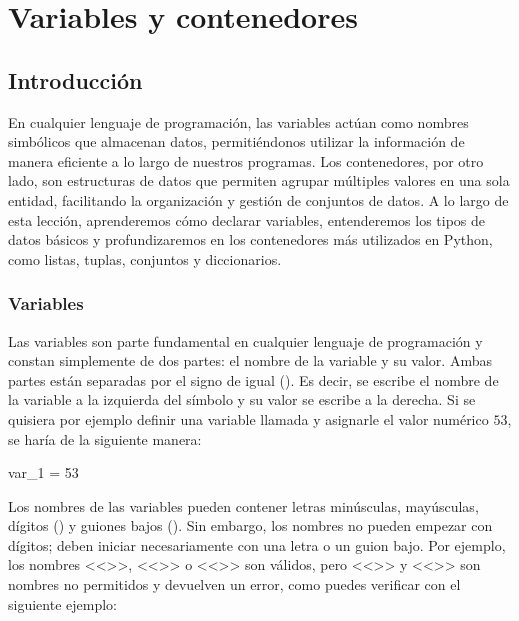 \chapter{Variables y contenedores}

\setcounter{ipythcntr}{0}

\section{Introducción}
En cualquier lenguaje de programación, las variables actúan como nombres simbólicos que almacenan datos, permitiéndonos utilizar la información de manera eficiente a lo largo de nuestros programas. Los contenedores, por otro lado, son estructuras de datos que permiten agrupar múltiples valores en una sola entidad, facilitando la organización y gestión de conjuntos de datos. A lo largo de esta lección, aprenderemos cómo declarar variables, entenderemos los tipos de datos básicos y profundizaremos en los contenedores más utilizados en Python, como listas, tuplas, conjuntos y diccionarios.

\subsection{Variables}

Las variables son parte fundamental en cualquier lenguaje de programación y constan simplemente de dos partes: el nombre de la variable y su valor. Ambas partes están separadas por el signo de igual (\pynorm{=}). Es decir, se escribe el nombre de la variable a la izquierda del símbolo \pynorm{=} y su valor se escribe a la derecha. Si se quisiera por ejemplo definir una variable llamada  y asignarle el valor numérico \(53\), se haría de la siguiente manera:

\begin{pyin}
var_1 = 53
\end{pyin}

Los nombres de las variables pueden contener letras minúsculas, mayúsculas, dígitos () y guiones bajos (\pynorm{_}). Sin embargo, los nombres no pueden empezar con dígitos; deben iniciar necesariamente con una letra o un guion bajo. Por ejemplo, los nombres <<>>, <<>> o <<>> son válidos, pero <<>> y <<>> son nombres no permitidos y devuelven un error, como puedes verificar con el siguiente ejemplo:

